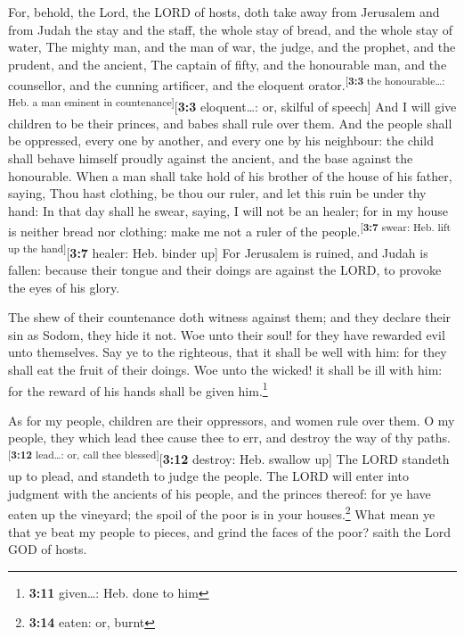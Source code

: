  For, behold, the Lord, the LORD of hosts, doth take away
from Jerusalem and from Judah the stay and the staff, the whole stay of
bread, and the whole stay of water,  The mighty man, and
the man of war, the judge, and the prophet, and the prudent, and the
ancient,  The captain of fifty, and the honourable man,
and the counsellor, and the cunning artificer, and the eloquent
orator.\textsuperscript{{[}\textbf{3:3} the honourable\ldots: Heb. a man
eminent in countenance{]}}{[}\textbf{3:3} eloquent\ldots: or, skilful of
speech{]}  And I will give children to be their princes,
and babes shall rule over them.  And the people shall be
oppressed, every one by another, and every one by his neighbour: the
child shall behave himself proudly against the ancient, and the base
against the honourable.  When a man shall take hold of his
brother of the house of his father, saying, Thou hast clothing, be thou
our ruler, and let this ruin be under thy hand:  In that
day shall he swear, saying, I will not be an healer; for in my house is
neither bread nor clothing: make me not a ruler of the
people.\textsuperscript{{[}\textbf{3:7} swear: Heb. lift up the
hand{]}}{[}\textbf{3:7} healer: Heb. binder up{]}  For
Jerusalem is ruined, and Judah is fallen: because their tongue and their
doings are against the LORD, to provoke the eyes of his glory.

 The shew of their countenance doth witness against them;
and they declare their sin as Sodom, they hide it not. Woe unto their
soul! for they have rewarded evil unto themselves.  Say
ye to the righteous, that it shall be well with him: for they shall eat
the fruit of their doings.  Woe unto the wicked! it shall
be ill with him: for the reward of his hands shall be given
him.\footnote{\textbf{3:11} given\ldots: Heb. done to him}

 As for my people, children are their oppressors, and
women rule over them. O my people, they which lead thee cause thee to
err, and destroy the way of thy paths.\textsuperscript{{[}\textbf{3:12}
lead\ldots: or, call thee blessed{]}}{[}\textbf{3:12} destroy: Heb.
swallow up{]}  The LORD standeth up to plead, and
standeth to judge the people.  The LORD will enter into
judgment with the ancients of his people, and the princes thereof: for
ye have eaten up the vineyard; the spoil of the poor is in your
houses.\footnote{\textbf{3:14} eaten: or, burnt}  What
mean ye that ye beat my people to pieces, and grind the faces of the
poor? saith the Lord GOD of hosts.

